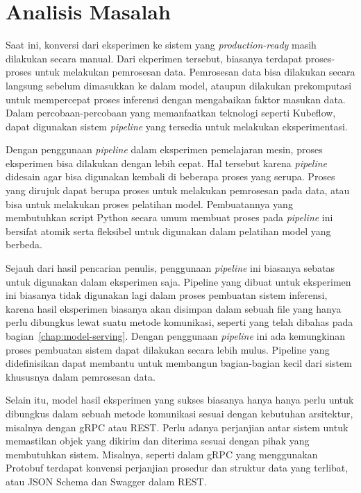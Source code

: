 \section{Analisis Masalah}

Saat ini, konversi dari eksperimen ke sistem yang \textit{production-ready} masih dilakukan secara manual.
Dari ekperimen tersebut, biasanya terdapat proses-proses untuk melakukan pemrosesan data.
Pemrosesan data bisa dilakukan secara langsung sebelum dimasukkan ke dalam model, ataupun dilakukan prekomputasi untuk mempercepat proses inferensi dengan mengabaikan faktor masukan data.
Dalam percobaan-percobaan yang memanfaatkan teknologi seperti Kubeflow, dapat digunakan sistem \textit{pipeline} yang tersedia untuk melakukan eksperimentasi.

Dengan penggunaan \textit{pipeline} dalam eksperimen pemelajaran mesin, proses eksperimen bisa dilakukan dengan lebih cepat.
Hal tersebut karena \textit{pipeline} didesain agar bisa digunakan kembali di beberapa proses yang serupa.
Proses yang dirujuk dapat berupa proses untuk melakukan pemrosesan pada data, atau bisa untuk melakukan proses pelatihan model.
Pembuatannya yang membutuhkan script Python secara umum membuat proses pada \textit{pipeline} ini bersifat atomik serta fleksibel untuk digunakan dalam pelatihan model yang berbeda.

Sejauh dari hasil pencarian penulis, penggunaan \textit{pipeline} ini biasanya sebatas  untuk digunakan dalam eksperimen saja.
Pipeline yang dibuat untuk eksperimen ini biasanya tidak digunakan lagi dalam proses pembuatan sistem inferensi, karena hasil eksperimen biasanya akan disimpan dalam sebuah file yang hanya perlu dibungkus lewat suatu metode komunikasi, seperti yang telah dibahas pada bagian~\ref{chap:model-serving}.
Dengan penggunaan \textit{pipeline} ini ada kemungkinan proses pembuatan sistem dapat dilakukan secara lebih mulus.
Pipeline yang didefinisikan dapat membantu untuk membangun bagian-bagian kecil dari sistem khususnya dalam pemrosesan data. 

Selain itu, model hasil eksperimen yang sukses biasanya hanya hanya perlu untuk dibungkus dalam sebuah metode komunikasi sesuai dengan kebutuhan arsitektur, misalnya dengan gRPC atau REST.\@
Perlu adanya perjanjian antar sistem untuk memastikan objek yang dikirim dan diterima sesuai dengan pihak yang membutuhkan sistem.
Misalnya, seperti dalam gRPC yang menggunakan Protobuf terdapat konvensi perjanjian prosedur dan struktur data yang terlibat, atau JSON Schema dan Swagger dalam REST.\@
